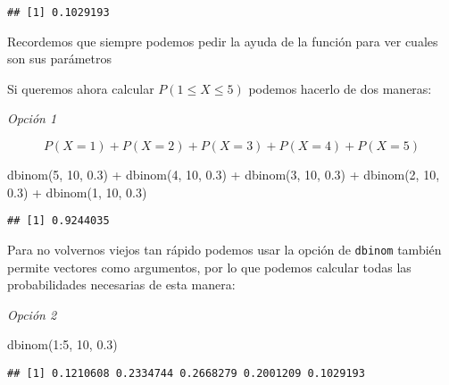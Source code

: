 \documentclass[
]{article}
\newenvironment{Shaded}{\begin{snugshade}}{\end{snugshade}}
\newcommand{\DecValTok}[1]{\textcolor[rgb]{0.00,0.00,0.81}{#1}}
\newcommand{\FloatTok}[1]{\textcolor[rgb]{0.00,0.00,0.81}{#1}}
\newcommand{\FunctionTok}[1]{\textcolor[rgb]{0.00,0.00,0.00}{#1}}
\newcommand{\NormalTok}[1]{#1}
\newcommand{\SpecialCharTok}[1]{\textcolor[rgb]{0.00,0.00,0.00}{#1}}
\begin{document}
\begin{verbatim}
## [1] 0.1029193
\end{verbatim}

Recordemos que siempre podemos pedir la ayuda de la función para ver
cuales son sus parámetros

Si queremos ahora calcular \(P(1\leqslant X \leqslant 5)\) podemos
hacerlo de dos maneras:

\emph{Opción 1}

\[P(X = 1) + P(X = 2) + P(X = 3) + P(X = 4) + P(X = 5)\]

\begin{Shaded}
\begin{Highlighting}[]
\FunctionTok{dbinom}\NormalTok{(}\DecValTok{5}\NormalTok{, }\DecValTok{10}\NormalTok{, }\FloatTok{0.3}\NormalTok{) }\SpecialCharTok{+}
  \FunctionTok{dbinom}\NormalTok{(}\DecValTok{4}\NormalTok{, }\DecValTok{10}\NormalTok{, }\FloatTok{0.3}\NormalTok{) }\SpecialCharTok{+}
  \FunctionTok{dbinom}\NormalTok{(}\DecValTok{3}\NormalTok{, }\DecValTok{10}\NormalTok{, }\FloatTok{0.3}\NormalTok{) }\SpecialCharTok{+}
  \FunctionTok{dbinom}\NormalTok{(}\DecValTok{2}\NormalTok{, }\DecValTok{10}\NormalTok{, }\FloatTok{0.3}\NormalTok{) }\SpecialCharTok{+}
  \FunctionTok{dbinom}\NormalTok{(}\DecValTok{1}\NormalTok{, }\DecValTok{10}\NormalTok{, }\FloatTok{0.3}\NormalTok{)}
\end{Highlighting}
\end{Shaded}

\begin{verbatim}
## [1] 0.9244035
\end{verbatim}

Para no volvernos viejos tan rápido podemos usar la opción de
\texttt{dbinom} también permite vectores como argumentos, por lo que
podemos calcular todas las probabilidades necesarias de esta manera:

\emph{Opción 2}

\begin{Shaded}
\begin{Highlighting}[]
\FunctionTok{dbinom}\NormalTok{(}\DecValTok{1}\SpecialCharTok{:}\DecValTok{5}\NormalTok{, }\DecValTok{10}\NormalTok{, }\FloatTok{0.3}\NormalTok{)}
\end{Highlighting}
\end{Shaded}

\begin{verbatim}
## [1] 0.1210608 0.2334744 0.2668279 0.2001209 0.1029193
\end{verbatim}
\end{document}
